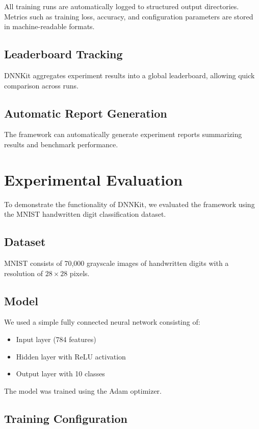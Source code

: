 \documentclass{article}
\begin{document}
All training runs are automatically logged to structured output directories.
Metrics such as training loss, accuracy, and configuration parameters are stored
in machine-readable formats.

\subsection{Leaderboard Tracking}

DNNKit aggregates experiment results into a global leaderboard,
allowing quick comparison across runs.

\subsection{Automatic Report Generation}

The framework can automatically generate experiment reports summarizing results
and benchmark performance.

\section{Experimental Evaluation}

To demonstrate the functionality of DNNKit,
we evaluated the framework using the MNIST handwritten digit classification dataset.

\subsection{Dataset}

MNIST consists of 70,000 grayscale images of handwritten digits
with a resolution of $28 \times 28$ pixels.

\subsection{Model}

We used a simple fully connected neural network consisting of:

\begin{itemize}
\item Input layer (784 features)
\item Hidden layer with ReLU activation
\item Output layer with 10 classes
\end{itemize}

The model was trained using the Adam optimizer.

\subsection{Training Configuration}
\end{document}
